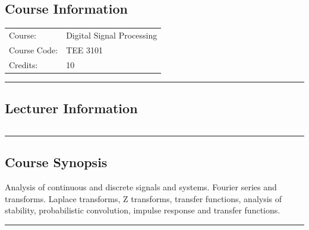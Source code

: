 
\subsection*{Course Information}\label{course:tee3101}
\vspace{0ex}%
\noindent\parbox{0.5\textwidth}{%
    \noindent\begin{tabular}{@{}ll}
                 \textsf{Course:}          & 	Digital Signal Processing  \\
                 \textsf{Course Code:}         & 	TEE 3101    \\
                 \textsf{Credits:}    & 	10
    \end{tabular}}
\vspace{2ex}\hrule\vspace{2ex}

\subsection*{Lecturer Information}
\noindent\parbox{0.5\textwidth}{%
    \noindent\begin{tabular}{@{}ll}
                 
    \end{tabular}}
\vspace{2ex}\hrule\vspace{2ex}


\subsection*{Course Synopsis}
Analysis of continuous and discrete signals and systems.
Fourier series and transforms.
Laplace transforms, Z transforms, transfer functions, analysis of stability, probabilistic convolution, impulse response and transfer functions.
\vspace{2ex} \hrule\vspace{2ex}

